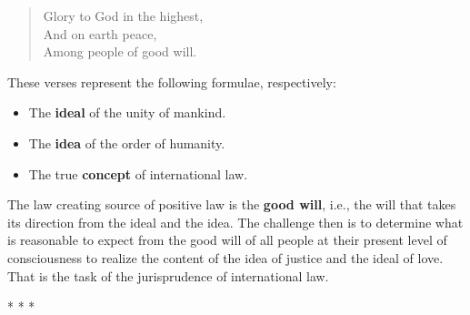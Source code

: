 \begin{verse}
Glory to God in the highest,\\
And on earth peace,\\
Among people of good will.
\end{verse}

These verses represent the following formulae, respectively:

\begin{itemize}


\item The \textbf{ideal} of the unity of mankind.

\item The \textbf{idea} of the order of humanity.

\item The true \textbf{concept} of international law.
\end{itemize}


The law creating source of positive law is the \textbf{good will}, i.e., the will that takes its direction from the ideal and the idea. The challenge then is to determine what is reasonable to expect from the good will of all people at their present level of consciousness to realize the content of the idea of justice and the ideal of love. That is the task of the jurisprudence of international law.



\begin{center}* * *\end{center}

